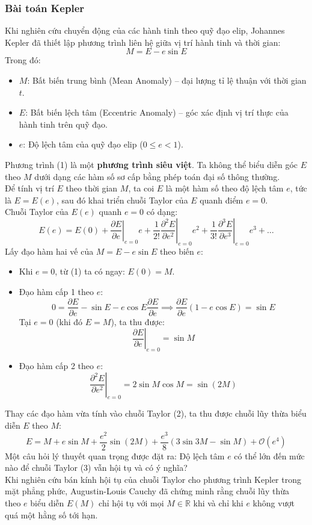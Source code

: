 \documentclass[12pt]{article}
\theoremstyle{definition}
\theoremstyle{remark}
\begin{document}
\subsubsection{Bài toán Kepler}
Khi nghiên cứu chuyển động của các hành tinh theo quỹ đạo elip, Johannes Kepler đã thiết lập phương trình liên hệ giữa vị trí hành tinh và thời gian:
\begin{equation}
    M = E - e \sin E
\end{equation}
Trong đó:
\begin{itemize}
    \item $M$: Bất biến trung bình (Mean Anomaly) -- đại lượng tỉ lệ thuận với thời gian $t$.
    \item $E$: Bất biến lệch tâm (Eccentric Anomaly) -- góc xác định vị trí thực của hành tinh trên quỹ đạo.
    \item $e$: Độ lệch tâm của quỹ đạo elip ($0 \le e < 1$).
\end{itemize}
Phương trình (1) là một \textbf{phương trình siêu việt}. Ta không thể biểu diễn góc $E$ theo $M$ dưới dạng các hàm số sơ cấp bằng phép toán đại số thông thường.\\
Để tính vị trí $E$ theo thời gian $M$, ta coi $E$ là một hàm số theo độ lệch tâm $e$, tức là $E = E(e)$, sau đó khai triển chuỗi Taylor của $E$ quanh điểm $e = 0$.\\
Chuỗi Taylor của $E(e)$ quanh $e = 0$ có dạng:
\begin{equation}
    E(e) = E(0) + \left. \frac{\partial E}{\partial e} \right|_{e=0} e + \frac{1}{2!} \left. \frac{\partial^2 E}{\partial e^2} \right|_{e=0} e^2 + \frac{1}{3!} \left. \frac{\partial^3 E}{\partial e^3} \right|_{e=0} e^3 + \dots
\end{equation}
Lấy đạo hàm hai vế của $M = E - e \sin E$ theo biến $e$:
\begin{itemize}
    \item Khi $e = 0$, từ (1) ta có ngay: $E(0) = M$.
    \item Đạo hàm cấp 1 theo $e$:
    \[
    0 = \frac{\partial E}{\partial e} - \sin E - e \cos E \frac{\partial E}{\partial e} \implies \frac{\partial E}{\partial e} (1 - e \cos E) = \sin E
    \]
    Tại $e = 0$ (khi đó $E = M$), ta thu được:
    \[
    \left. \frac{\partial E}{\partial e} \right|_{e=0} = \sin M
    \]
    \item Đạo hàm cấp 2 theo $e$:
    \[
    \left. \frac{\partial^2 E}{\partial e^2} \right|_{e=0} = 2 \sin M \cos M = \sin(2M)
    \]
\end{itemize}
Thay các đạo hàm vừa tính vào chuỗi Taylor (2), ta thu được chuỗi lũy thừa biểu diễn $E$ theo $M$:
\begin{equation}
    E = M + e \sin M + \frac{e^2}{2} \sin(2M) + \frac{e^3}{8} (3\sin 3M - \sin M) + \mathcal{O}(e^4)
\end{equation}
Một câu hỏi lý thuyết quan trọng được đặt ra: Độ lệch tâm $e$ có thể lớn đến mức nào để chuỗi Taylor (3) vẫn hội tụ và có ý nghĩa?\\
Khi nghiên cứu bán kính hội tụ của chuỗi Taylor cho phương trình Kepler trong mặt phẳng phức, Augustin-Louis Cauchy đã chứng minh rằng chuỗi lũy thừa theo $e$ biểu diễn $E(M)$ chỉ hội tụ với mọi $M \in \mathbb{R}$ khi và chỉ khi $e$ không vượt quá một hằng số tới hạn.
\end{document}
